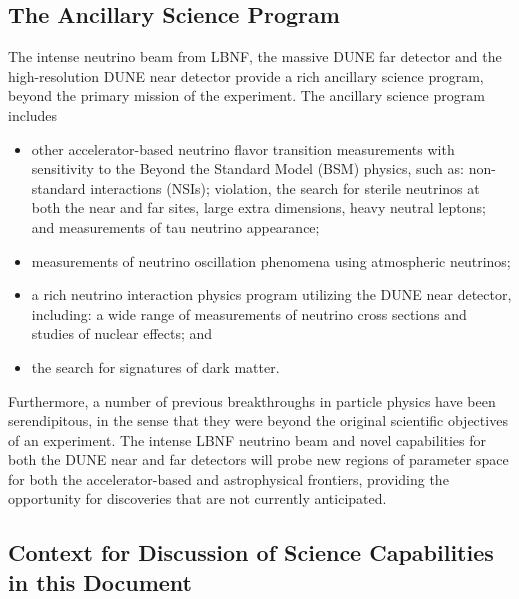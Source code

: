 \subsection{The Ancillary Science Program}

The intense neutrino beam from LBNF, the massive DUNE \lartpc far detector and the high-resolution
  DUNE near detector provide a rich ancillary science program, beyond the primary mission of the experiment. The ancillary science program includes
\begin{itemize}
     \item other accelerator-based neutrino flavor transition measurements with sensitivity to the Beyond the Standard Model (BSM) physics, such as: non-standard interactions (NSIs);  violation, the search for sterile neutrinos at both the near and far sites, large extra dimensions, heavy neutral leptons;
 and measurements of tau neutrino appearance;
     \item measurements of neutrino oscillation phenomena using atmospheric neutrinos;
     \item a rich neutrino interaction physics program utilizing the DUNE near detector, including: a wide range of measurements of neutrino cross sections and studies of nuclear effects; and
     \item  the search for signatures of dark matter.
\end{itemize} 

Furthermore, a number of previous breakthroughs in particle physics have been serendipitous, in the sense that they were beyond the
original scientific objectives of an experiment. The intense LBNF neutrino beam and novel capabilities for both 
the DUNE near and far detectors will probe new regions of parameter space for both the accelerator-based and astrophysical frontiers, 
providing the opportunity for discoveries that are not currently anticipated.

\subsection{Context for Discussion of Science Capabilities in this Document}

